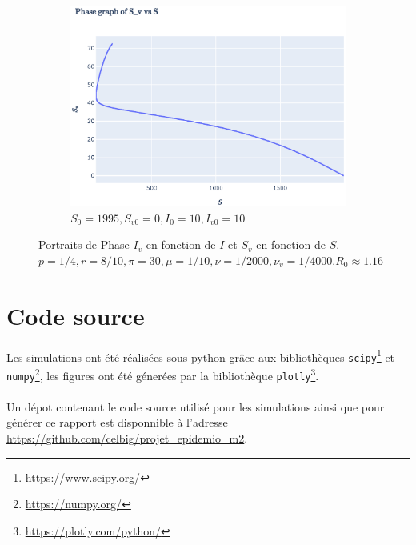 \documentclass[11pt]{article}
\begin{document}
\begin{figure}[th]
\begin{subfigure}{0.49\textwidth}
	  \includegraphics[width=\linewidth]{../figures/ex2_SvS_3.eps}  
	  \caption{$S_0 = 1995, S_{v0} = 0,I_0 = 10, I_{v0} = 10$}
	\end{subfigure}

	\centering
	\caption{Portraits de Phase $I_v$ en fonction de $I$ et $S_v$ en fonction de $S$. \\
	$p = 1/4,
		r = 8/10, 
		\pi = 30,
		\mu = 1/10, \nu = 1/2000,
		\nu_v = 1/4000. R_0 \approx 1.16$ 
	}
	\label{fig:ex2 SvS}
\end{figure}

\clearpage

\section*{Code source}
Les simulations ont \'et\'e r\'ealis\'ees sous python gr\^ace aux biblioth\`eques \texttt{scipy}\footnote{\url{https://www.scipy.org/}} et \texttt{numpy}\footnote{\url{https://numpy.org/}}, les figures ont \'et\'e g\'ener\'ees par la biblioth\`eque \texttt{plotly}\footnote{\url{https://plotly.com/python/}}.

\paragraph{}Un d\'epot contenant le code source utilis\'e pour les simulations ainsi que pour g\'en\'erer ce rapport est disponnible \`a l'adresse \url{https://github.com/celbig/projet_epidemio_m2}.
\end{document}
